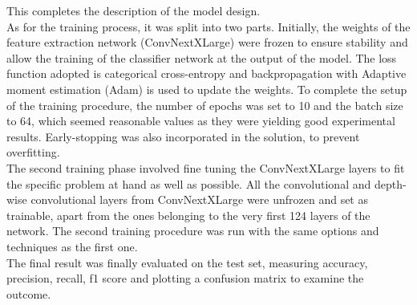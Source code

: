\documentclass[11pt]{article}
\begin{document}
\begin{multicols}{2}
        This completes the description of the model design. \\
        As for the training process, it was split into two parts. Initially, the weights of the feature extraction network (ConvNextXLarge) were frozen to ensure stability and allow the training of the classifier network at the output of the model. The loss function adopted is categorical cross-entropy and backpropagation with Adaptive moment estimation (Adam) is used to update the weights. To complete the setup of the training procedure, the number of epochs was set to 10 and the batch size to 64, which seemed reasonable values as they were yielding good experimental results. Early-stopping was also incorporated in the solution, to prevent overfitting. \\
        The second training phase involved fine tuning the ConvNextXLarge layers to fit the specific problem at hand as well as possible. All the convolutional and depth-wise convolutional layers from ConvNextXLarge were unfrozen and set as trainable, apart from the ones belonging to the very first 124 layers of the network. The second training procedure was run with the same options and techniques as the first one.\\
        The final result was finally evaluated on the test set, measuring accuracy, precision, recall, f1 score and plotting a confusion matrix to examine the outcome.



\end{multicols}
\end{document}
